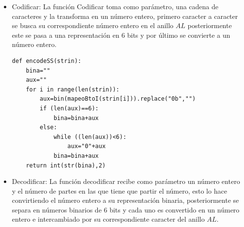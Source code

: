 \documentclass[12pt,oneside,onecolumn,openany]{report}
\begin{document}
\begin{itemize}
\begin{lstlisting}[frame=single]
            #dx = random.randint(4, 6)
            #dy = random.randint(4, 8)
            im = Image.new('RGBA', (w+30 , h+25 ))
            Draw(im).text((0, 0), c, font=font, fill=color)

            # rotate
            #im = im.crop(im.getbbox())
            #im = im.rotate(random.uniform(-30, 30)
            , Image.BILINEAR, expand=1)

            # warp
            #dx = w * random.uniform(0.1, 0.3)
            #dy = h * random.uniform(0.2, 0.3)
            #x1 = int(random.uniform(-dx, dx))
            #y1 = int(random.uniform(-dy, dy))
            #x2 = int(random.uniform(-dx, dx))
            #y2 = int(random.uniform(-dy, dy))
            #w2 = w + abs(x1) + abs(x2)
            #h2 = h + abs(y1) + abs(y2)
            #data = (
            #    x1, y1,
            #    -x1, h2 - y2,
            #    w2 + x2, h2 + y2,
            #    w2 - x2, -y1,
            #)
            #im = im.resize((w2, h2))
            #im = im.transform((w, h), Image.QUAD, data)
            return im

        images = []
        for c in chars:
            images.append(_draw_character(c))

        text_width = sum([im.size[0] for im in images])

        width = max(text_width, self._width)
        image = image.resize((width, self._height))

        average = int(text_width / len(chars))
        rand = int(0.25 * average)
        offset = int(average * 0.1)

        for im in images:
            w, h = im.size
            mask = im.convert('L').point(lambda i: i * 1.97)
            
            image.paste(im, (offset, int((self._height - h) / 2))
            , mask)
            
            offset = offset + w + random.randint(-rand, 0)

        return image
 \end{lstlisting}
\item Codificar: La función Codificar toma como parámetro, una cadena de caracteres y la transforma en un número entero, primero caracter a caracter se busca su correspondiente número entero en el anillo $AL$ posteriormente este se pasa a una representación en 6 bits y por último se convierte a un número entero.
\begin{lstlisting}[frame=single]
 def encodeSS(strin):
	bina=""
	aux=""
	for i in range(len(strin)):
		aux=bin(mapeoBtoI(strin[i])).replace("0b","")
		if (len(aux)==6):
			bina=bina+aux
		else:
			while ((len(aux))<6):
				aux="0"+aux
			bina=bina+aux
	return int(str(bina),2)
\end{lstlisting}
\item Decodificar: La función decodificar recibe como parámetro un número entero y el número de partes en las que tiene que partir el número, esto lo hace convirtiendo el número entero a su representación binaria, posteriormente se separa en números binarios de 6 bits y cada uno es convertido en un número entero e intercambiado por su correspondiente caracter del anillo $AL$.


\end{itemize}
\end{document}
